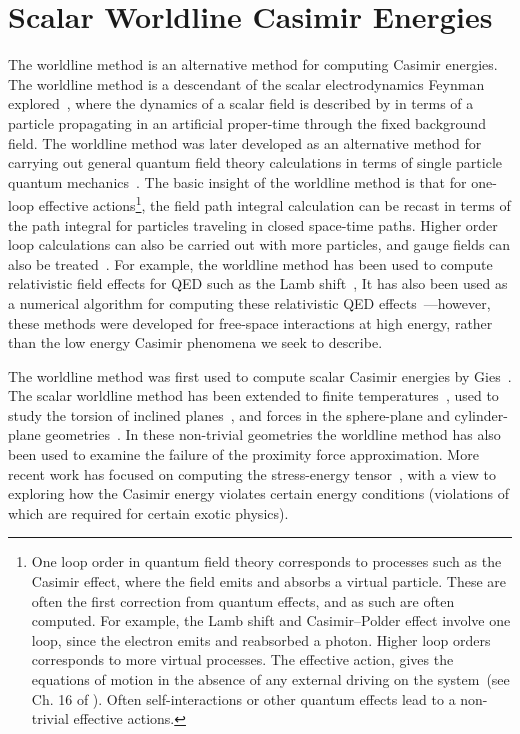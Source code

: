 \section{Scalar Worldline Casimir Energies}
\label{sec:dirichlet_worldline}
The worldline method is an alternative method for computing Casimir energies.
The worldline method is a descendant of the scalar electrodynamics 
Feynman explored~\cite{Feynman1950}, where the dynamics of a scalar field 
is described by in terms of a particle propagating in an artificial proper-time through the fixed background field. 
The worldline method was later developed as an alternative method for 
carrying out general quantum field theory calculations in terms of single particle 
quantum mechanics~\cite{McKeon1993, Strassler1992,Schubert2001}.  
The basic insight of the worldline method is that for one-loop effective actions\footnote{
One loop order in quantum field theory corresponds to processes such as the Casimir effect,
where the field emits and absorbs a virtual particle.  These are often the first 
correction from quantum effects, and as such are often computed.  For example, the Lamb shift and Casimir--Polder 
effect involve one loop, since the electron emits and reabsorbed a photon.  Higher loop orders 
corresponds to more virtual processes.  
The effective action, gives the equations of motion
in the absence of any external driving on the system~(see Ch. 16 of \cite{WeinbergQFT2}).  Often self-interactions or other
quantum effects lead to a non-trivial effective actions.}, 
the field path integral calculation can be recast in terms of the path
 integral for particles traveling in closed space-time paths.
  Higher order loop calculations can also be carried out with more particles, 
and gauge fields can also be treated~\cite{Schubert2001}.
For example, the worldline method has been used to compute relativistic
field effects for QED such as the Lamb shift~\cite{Schmidt1995},  
It has also been used as a numerical algorithm for computing these relativistic 
QED effects~\cite{Mazur2014}---however, these methods were developed for free-space interactions at high energy, rather than the 
low energy Casimir phenomena we seek to describe.  

The worldline method was first used to compute scalar Casimir energies by Gies\etal~\cite{Gies2003,Gies2006, Gies2006a}.
The scalar worldline method has been extended to finite temperatures~\cite{Klingmueller2008},
 used to study the torsion of inclined planes~\cite{Weber2009},
and forces in the sphere-plane and cylinder-plane geometries~\cite{Weber2010, Weber2010a}.  
In these non-trivial geometries the worldline method has also been used to examine the failure of the proximity force approximation.
More recent work has focused on computing the stress-energy tensor~\cite{Schafer2012, Schafer2016},
with a view to exploring how the Casimir energy violates certain energy conditions (violations of which are required for certain exotic physics).

